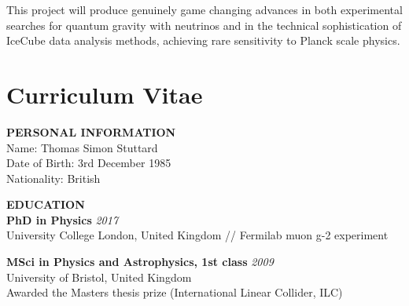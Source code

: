 \documentclass[a4paper,11pt]{article}
\renewcommand{\smallskip} {\vspace{0.1in}}
\begin{document}
This project will produce genuinely game changing advances in both experimental searches for quantum gravity with neutrinos and in the technical sophistication of IceCube data analysis methods, achieving rare sensitivity to Planck scale physics. \\






\newpage

\section{Curriculum Vitae}


\vspace{0.2cm}
\textbf{PERSONAL INFORMATION ~~\hrulefill}\smallskip\\
Name: Thomas Simon Stuttard \\
Date of Birth: 3rd December 1985\\
Nationality: British

%
\vspace{0.2cm}
\textbf{EDUCATION ~~\hrulefill}\smallskip\\
%
{\bf PhD in Physics} \hfill {\em 2017} \\ 
University College London, United Kingdom // Fermilab muon g-2 experiment

{\bf MSci in Physics and Astrophysics, 1st class} \hfill {\em 2009} \\ 
University of Bristol, United Kingdom \\
Awarded the Masters thesis prize (International Linear Collider, ILC)
\end{document}
